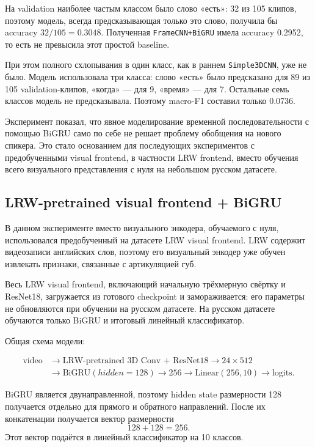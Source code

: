 \documentclass[12pt,a4paper]{article}
\begin{document}
На validation наиболее частым классом было слово «есть»:
32 из 105 клипов, поэтому модель, всегда предсказывающая только это слово,
получила бы accuracy $32/105=0.3048$. Полученная
\texttt{FrameCNN+BiGRU} имела accuracy 0.2952, то есть не превысила этот
простой baseline.

При этом полного схлопывания в один класс, как в раннем
\texttt{Simple3DCNN}, уже не было. Модель использовала три класса:
слово «есть» было предсказано для 89 из 105 validation-клипов,
«когда» --- для 9, «время» --- для 7. Остальные семь классов модель
не предсказывала. Поэтому macro-F1 составил только 0.0736.

Эксперимент показал, что явное моделирование временной последовательности
с помощью BiGRU само по себе не решает проблему обобщения на нового
спикера. Это стало основанием для последующих экспериментов с
предобученными visual frontend, в частности LRW frontend, вместо обучения
всего визуального представления с нуля на небольшом русском датасете.

\subsection{LRW-pretrained visual frontend + BiGRU}

В данном эксперименте вместо визуального энкодера, обучаемого с нуля,
использовался предобученный на датасете LRW visual frontend.
LRW содержит видеозаписи английских слов, поэтому его визуальный энкодер
уже обучен извлекать признаки, связанные с артикуляцией губ.

Весь LRW visual frontend, включающий начальную трёхмерную свёртку
и ResNet18, загружается из готового checkpoint и замораживается:
его параметры не обновляются при обучении на русском датасете.
На русском датасете обучаются только BiGRU и итоговый линейный
классификатор.

Общая схема модели:

\[
\begin{aligned}
\text{video}
&\rightarrow \text{LRW-pretrained 3D Conv + ResNet18}
\rightarrow 24 \times 512 \\
&\rightarrow \text{BiGRU}(hidden=128)
\rightarrow 256
\rightarrow \text{Linear}(256,10)
\rightarrow \text{logits}.
\end{aligned}
\]

BiGRU является двунаправленной, поэтому hidden state размерности 128
получается отдельно для прямого и обратного направлений.
После их конкатенации получается вектор размерности
\[
128 + 128 = 256.
\]
Этот вектор подаётся в линейный классификатор на 10 классов.
\end{document}
